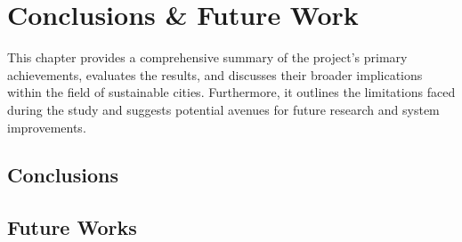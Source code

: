 \chapter{Conclusions \& Future Work}\label{ch:conclusions}

This chapter provides a comprehensive summary of the project's primary achievements, evaluates the results, and discusses their broader implications within the field of sustainable cities. Furthermore, it outlines the limitations faced during the study and suggests potential avenues for future research and system improvements.

\section{Conclusions}\label{sec:conclusions:conclusions}

\section{Future Works}\label{sec:conclusions:future-works}
